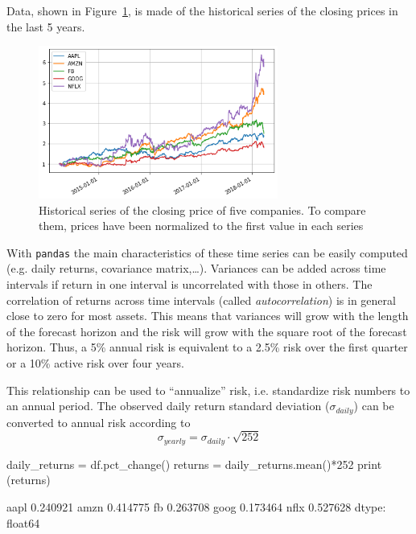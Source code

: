 Data, shown in Figure~\ref{fig:stocks}, is made of the historical series of the closing prices in the last 5 years. 

\begin{figure}[htbp]
	\centering
	\includegraphics[width=0.7\textwidth]{figures/portfolio_sample}
	\caption{Historical series of the closing price of five companies. To compare them, prices have been normalized to the first value in each series}
	\label{fig:stocks}
\end{figure}

With \texttt{pandas} the main characteristics of these time series can be easily computed (e.g. daily returns, covariance matrix,\ldots).
Variances can be added across time intervals if return in one interval is uncorrelated with those in others. The correlation of returns across time intervals (called \emph{autocorrelation}) is in general close to zero for most assets. This means that variances will grow with the length of the forecast horizon and the risk will grow with the square root of the forecast horizon. 
Thus, a 5\% annual risk is equivalent to a 2.5\% risk over the first quarter or a 10\% active risk over four years. 

This relationship can be used to “annualize” risk, i.e. standardize risk numbers to an annual period. The observed daily return standard deviation ($\sigma_{daily}$) can be converted to annual risk according to
\begin{equation}
\sigma_{yearly} = \sigma_{daily}\cdot\sqrt{252}
\end{equation}

\begin{ipython}
daily_returns = df.pct_change()
returns = daily_returns.mean()*252
print (returns)
\end{ipython}
\begin{ioutput}
aapl    0.240921
amzn    0.414775
fb      0.263708
goog    0.173464
nflx    0.527628
dtype: float64
\end{ioutput}

